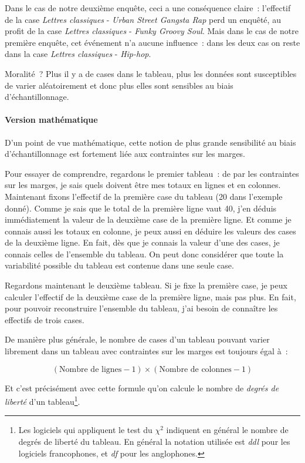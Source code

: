 \documentclass[a4paper,10pt,twoside,francais]{report}
\newcommand{\chid}{$\chi^2$\xspace}
\begin{document}
Dans le cas de notre deuxième enquête, ceci a une conséquence claire~:
l'effectif de la case \textit{Lettres classiques} - \textit{Urban
  Street Gangsta Rap} perd un enquêté, au profit de la case
\textit{Lettres classiques} - \textit{Funky Groovy Soul}. Mais dans le
cas de notre première enquête, cet événement n'a aucune influence~:
dans les deux cas on reste dans la case \textit{Lettres classiques} -
\textit{Hip-hop}.

Moralité~? Plus il y a de cases dans le tableau, plus les données sont
susceptibles de varier aléatoirement et donc plus elles sont sensibles
au biais d'échantillonnage.

\paragraph{Version mathématique} D'un point de vue mathématique, cette
notion de \og plus grande sensibilité au biais d'échantillonnage \fg{} est
fortement liée aux contraintes sur les marges. 

Pour essayer de comprendre, regardons le premier tableau~: de par les
contraintes sur les marges, je sais quels doivent être mes totaux en
lignes et en colonnes. Maintenant fixons l'effectif de la première
case du tableau (20 dans l'exemple donné). Comme je sais que le total
de la première ligne vaut 40, j'en déduis immédiatement la valeur de
la deuxième case de la première ligne. Et comme je connais aussi les
totaux en colonne, je peux aussi en déduire les valeurs des cases de
la deuxième ligne. En fait, dès que je connais la valeur d'une des
cases, je connais celles de l'ensemble du tableau. On peut donc
considérer que toute la variabilité possible du tableau est contenue
dans une seule case.

Regardons maintenant le deuxième tableau. Si je fixe la première case,
je peux calculer l'effectif de la deuxième case de la première ligne,
mais pas plus. En fait, pour pouvoir reconstruire l'ensemble du
tableau, j'ai besoin de connaître les effectifs de trois cases.

De manière plus générale, le nombre de cases d'un tableau pouvant
varier \og librement \fg{} dans un tableau avec contraintes sur les marges
est toujours égal à~:

$$(\text{Nombre de lignes} - 1) \times (\text{Nombre de colonnes} -
1)$$

Et c'est précisément avec cette formule qu'on calcule le nombre de
\textit{degrés de liberté} d'un tableau\footnote{Les logiciels qui
  appliquent le test du \chid indiquent en général le nombre de degrés
  de liberté du tableau. En général la notation utilisée est
  \textit{ddl} pour les logiciels francophones, et \textit{df} pour
  les anglophones.}.
\end{document}
